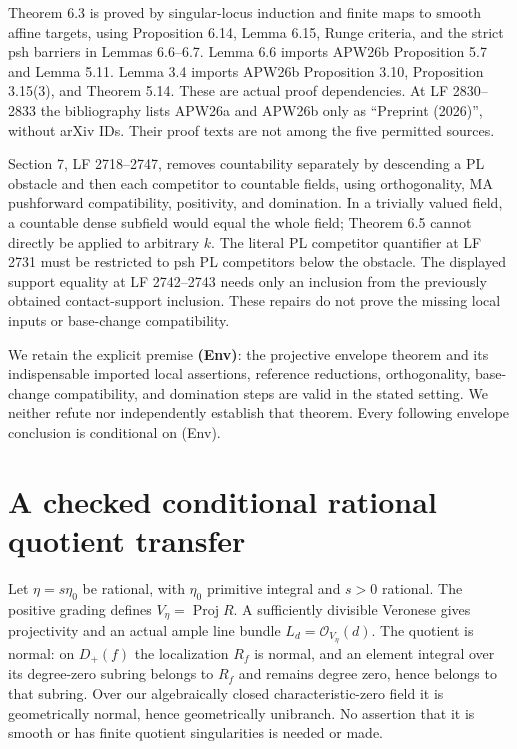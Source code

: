 \documentclass[11pt]{article}
\begin{document}
Theorem 6.3 is proved by singular-locus induction and finite maps to smooth affine targets, using Proposition 6.14, Lemma 6.15, Runge criteria, and the strict psh barriers in Lemmas 6.6--6.7.
Lemma 6.6 imports APW26b Proposition 5.7 and Lemma 5.11.
Lemma 3.4 imports APW26b Proposition 3.10, Proposition 3.15(3), and Theorem 5.14.
These are actual proof dependencies.
At LF 2830--2833 the bibliography lists APW26a and APW26b only as ``Preprint (2026)'', without arXiv IDs.
Their proof texts are not among the five permitted sources.

Section 7, LF 2718--2747, removes countability separately by descending a PL obstacle and then each competitor to countable fields, using orthogonality, MA pushforward compatibility, positivity, and domination.
In a trivially valued field, a countable dense subfield would equal the whole field; Theorem 6.5 cannot directly be applied to arbitrary $k$.
The literal PL competitor quantifier at LF 2731 must be restricted to psh PL competitors below the obstacle.
The displayed support equality at LF 2742--2743 needs only an inclusion from the previously obtained contact-support inclusion.
These repairs do not prove the missing local inputs or base-change compatibility.

We retain the explicit premise \textbf{(Env)}: the projective envelope theorem and its indispensable imported local assertions, reference reductions, orthogonality, base-change compatibility, and domination steps are valid in the stated setting.
We neither refute nor independently establish that theorem.
Every following envelope conclusion is conditional on (Env).

\section{A checked conditional rational quotient transfer}
Let $\eta=s\eta_0$ be rational, with $\eta_0$ primitive integral and $s>0$ rational.
The positive grading defines $V_\eta=\operatorname{Proj}R$.
A sufficiently divisible Veronese gives projectivity and an actual ample line bundle $L_d=\mathcal O_{V_\eta}(d)$.
The quotient is normal: on $D_+(f)$ the localization $R_f$ is normal, and an element integral over its degree-zero subring belongs to $R_f$ and remains degree zero, hence belongs to that subring.
Over our algebraically closed characteristic-zero field it is geometrically normal, hence geometrically unibranch.
No assertion that it is smooth or has finite quotient singularities is needed or made.
\end{document}

